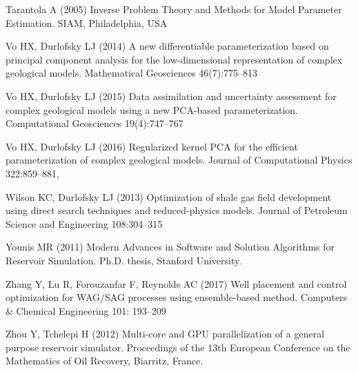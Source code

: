 \documentclass[11pt]{article}
\begin{document}
\begin{thebibliography}{51}
Tarantola A (2005) Inverse Problem Theory and Methods for Model Parameter
  Estimation. {SIAM}, Philadelphia, {USA}


Vo HX, Durlofsky LJ (2014) A new differentiable parameterization based on
  principal component analysis for the low-dimensional representation of
  complex geological models. Mathematical Geosciences 46(7):775--813

Vo HX, Durlofsky LJ (2015) Data assimilation and uncertainty assessment for
  complex geological models using a new PCA-based parameterization.
  Computational Geosciences 19(4):747--767

Vo HX, Durlofsky LJ (2016) Regularized kernel PCA for the efficient
  parameterization of complex geological models. Journal of Computational
  Physics 322:859--881, 

Wilson KC, Durlofsky LJ (2013) Optimization of shale gas field development
  using direct search techniques and reduced-physics models. Journal of
  Petroleum Science and Engineering 108:304--315

Younis MR (2011) Modern Advances in Software and Solution Algorithms for Reservoir Simulation. Ph.D. thesis, Stanford University.

Zhang Y, Lu R, Forouzanfar F, Reynolds AC (2017)
Well placement and control optimization for WAG/SAG processes using ensemble-based method.
Computers \& Chemical Engineering 101: 193--209


Zhou Y, Tchelepi H (2012)
Multi-core and GPU parallelization of a general purpose reservoir simulator.
Proceedings of the 13th European Conference on the Mathematics of Oil Recovery, Biarritz, France.


\end{thebibliography}
\end{document}
